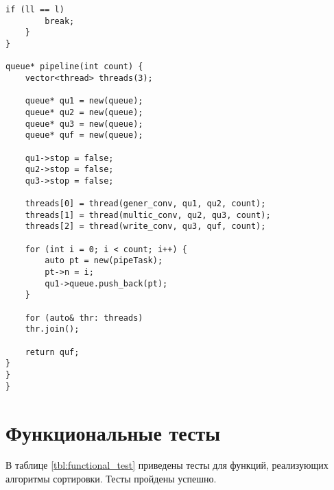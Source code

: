 \begin{lstlisting}[label=lst:shaker_sort,caption=Реализация функции параллелизации умножения разреженных матриц]
		if (ll == l)
		break; 
	}
}

queue* pipeline(int count) {
	vector<thread> threads(3);
	
	queue* qu1 = new(queue);
	queue* qu2 = new(queue);
	queue* qu3 = new(queue);
	queue* quf = new(queue);
	
	qu1->stop = false;
	qu2->stop = false;
	qu3->stop = false;
	
	threads[0] = thread(gener_conv, qu1, qu2, count);
	threads[1] = thread(multic_conv, qu2, qu3, count);
	threads[2] = thread(write_conv, qu3, quf, count);
	
	for (int i = 0; i < count; i++) {
		auto pt = new(pipeTask);
		pt->n = i;
		qu1->queue.push_back(pt);
	}
	
	for (auto& thr: threads)
	thr.join();
	
	return quf;
}
}
}
\end{lstlisting}

\section{Функциональные тесты}

В таблице \ref{tbl:functional_test} приведены тесты для функций, реализующих алгоритмы сортировки. Тесты пройдены успешно.

